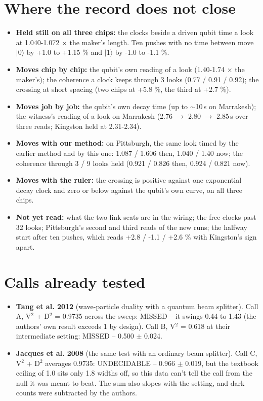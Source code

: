 \documentclass[11pt]{article}
\begin{document}
\section{Where the record does not close}
\begin{itemize}
\item \textbf{Held still on all three chips:} the clocks beside a driven qubit time a look at 1.040-1.072 \(\times\) the maker's length. Ten pushes with no time between move \(|0\rangle\) by +1.0 to +1.15 \% and \(|1\rangle\) by -1.0 to -1.1 \%.
\item \textbf{Moves chip by chip:} the qubit's own reading of a look (1.40-1.74 \(\times\) the maker's); the coherence a clock keeps through 3 looks (0.77 / 0.91 / 0.92); the crossing at short spacing (two chips at +5.8 \%, the third at +2.7 \%).
\item \textbf{Moves job by job:} the qubit's own decay time (up to \(\sim\)10\,\textmu s on Marrakesh); the witness's reading of a look on Marrakesh (2.76 \(\to\) 2.80 \(\to\) 2.85\,\textmu s over three reads; Kingston held at 2.31-2.34).
\item \textbf{Moves with our method:} on Pittsburgh, the same look timed by the earlier method and by this one: 1.087 / 1.606 then, 1.040 / 1.40 now; the coherence through 3 / 9 looks held (0.921 / 0.826 then, 0.924 / 0.821 now).
\item \textbf{Moves with the ruler:} the crossing is positive against one exponential decay clock and zero or below against the qubit's own curve, on all three chips.
\item \textbf{Not yet read:} what the two-link seats are in the wiring; the free clocks past 32 looks; Pittsburgh's second and third reads of the new runs; the halfway start after ten pushes, which reads +2.8 / -1.1 / +2.6 \% with Kingston's sign apart.
\end{itemize}
\section{Calls already tested}
\begin{itemize}
\item \textbf{Tang et al. 2012} (wave-particle duality with a quantum beam splitter). Call A, V\(^{2}\) + D\(^{2}\) = 0.9735 across the sweep: MISSED -- it swings 0.44 to 1.43 (the authors' own result exceeds 1 by design). Call B, V\(^{2}\) = 0.618 at their intermediate setting: MISSED -- 0.500 \(\pm\) 0.024.
\item \textbf{Jacques et al. 2008} (the same test with an ordinary beam splitter). Call C, V\(^{2}\) + D\(^{2}\) averages 0.9735: UNDECIDABLE -- 0.966 \(\pm\) 0.019, but the textbook ceiling of 1.0 sits only 1.8 widths off, so this data can't tell the call from the null it was meant to beat. The sum also slopes with the setting, and dark counts were subtracted by the authors.
\end{itemize}
\end{document}
